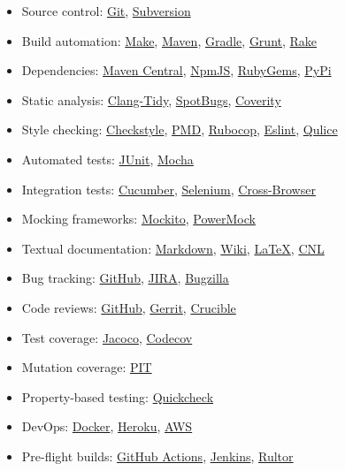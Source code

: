 \documentclass[nobrand,anonymous,nodate,nosecurity]{huawei}
\begin{document}
{\begin{itemize}
\item Source control:
	\href{https://git-scm.com}{Git},
	\href{https://subversion.apache.org}{Subversion}
\item Build automation:
	\href{https://en.wikipedia.org/wiki/Make_(software)}{Make},
	\href{https://maven.apache.org}{Maven},
	\href{https://gradle.org}{Gradle},
	\href{https://gruntjs.com}{Grunt},
	\href{https://github.com/ruby/rake}{Rake}
\item Dependencies:
	\href{https://maven.apache.org}{Maven Central},
	\href{https://www.npmjs.com}{NpmJS},
	\href{https://rubygems.org}{RubyGems},
	\href{https://pypi.org/project/pip/}{PyPi}
\item Static analysis:
	\href{https://clang.llvm.org/extra/clang-tidy/}{Clang-Tidy},
	\href{https://spotbugs.github.io}{SpotBugs},
	\href{https://scan.coverity.com}{Coverity}
\item Style checking:
  \href{https://checkstyle.sourceforge.io}{Checkstyle},
  \href{https://pmd.github.io}{PMD},
  \href{https://rubocop.org}{Rubocop},
  \href{https://eslint.org}{Eslint},
  \href{https://www.qulice.com}{Qulice}
\item Automated tests:
	\href{https://junit.org/}{JUnit},
	\href{https://mochajs.org}{Mocha}
\item Integration tests:
  \href{https://cucumber.io}{Cucumber},
  \href{https://www.selenium.dev}{Selenium},
  \href{https://en.wikipedia.org/wiki/Cross-browser_testing}{Cross-Browser}
\item Mocking frameworks:
	\href{https://site.mockito.org}{Mockito},
	\href{https://github.com/powermock/powermock}{PowerMock}
\item Textual documentation:
	\href{https://en.wikipedia.org/wiki/Markdown}{Markdown},
	\href{https://en.wikipedia.org/wiki/Wiki}{Wiki},
	\href{https://en.wikipedia.org/wiki/LaTeX}{LaTeX},
  \href{https://en.wikipedia.org/wiki/Controlled_natural_language}{CNL}
\item Bug tracking:
	\href{github.com/}{GitHub},
	\href{https://www.atlassian.com/software/jira}{JIRA},
	\href{https://www.bugzilla.org}{Bugzilla}
\item Code reviews:
	\href{github.com/}{GitHub},
	\href{https://www.gerritcodereview.com}{Gerrit},
	\href{https://www.atlassian.com/software/crucible}{Crucible}
\item Test coverage:
	\href{https://www.eclemma.org/jacoco/}{Jacoco},
	\href{codecov.io/}{Codecov}
\item Mutation coverage:
	\href{https://www.pitest.org}{PIT}
\item Property-based testing:
	\href{https://en.wikipedia.org/wiki/QuickCheck}{Quickcheck}
\item DevOps:
	\href{https://www.docker.com}{Docker},
	\href{https://www.heroku.com}{Heroku},
	\href{https://aws.amazon.com/}{AWS}
\item Pre-flight builds:
	\href{https://github.com/features/actions}{GitHub Actions},
	\href{https://www.jenkins.io}{Jenkins},
	\href{https://www.rultor.com}{Rultor}
\end{itemize}

}
\end{document}
